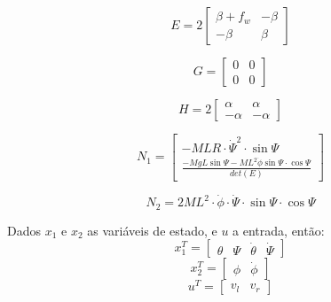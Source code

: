 \documentclass[12pt]{article}
\begin{document}
\begin{equation}
 E = 2  
 \begin{bmatrix}
  \beta + f_w &  -\beta \\ 
 -\beta & \beta
\end{bmatrix}
\end{equation}

\begin{equation}
 G =   
 \begin{bmatrix}
  0 &  0 \\ 
  0 & 0
\end{bmatrix}
\end{equation}

\begin{equation}
 H = 2  
 \begin{bmatrix}
  \alpha  &  \alpha \\ 
 -\alpha & -\alpha
\end{bmatrix}
\end{equation}

\begin{equation}
N_1 = 
\begin{bmatrix}
  -MLR \cdot \dot{\Psi}^2 \cdot \sin{\Psi}  \\ 
  \frac{-MgL \sin{\Psi} - ML^2\dot{\phi}\sin{\Psi} \cdot \cos{\Psi}}{det(E)}
\end{bmatrix}
\end{equation}

\begin{equation}
    N_2 = 2ML^2 \cdot \dot{\phi} \cdot \dot{\Psi} \cdot \sin{\Psi} \cdot  \cos{\Psi}
\end{equation}

\quad Dados $x_1$ e $x_2$ as variáveis de estado, e $u$ a entrada, então: 
\begin{equation}
x_1 ^T = 
\begin{bmatrix}
  \theta & \Psi & \dot{\theta} & \dot{\Psi}
\end{bmatrix}
\end{equation}
\begin{equation}
x_2 ^T = 
\begin{bmatrix}
  \phi & \dot{\phi} 
\end{bmatrix}
\end{equation}
\begin{equation}
u^T = 
\begin{bmatrix}
  v_l & v_r 
\end{bmatrix}
\end{equation}
\end{document}
